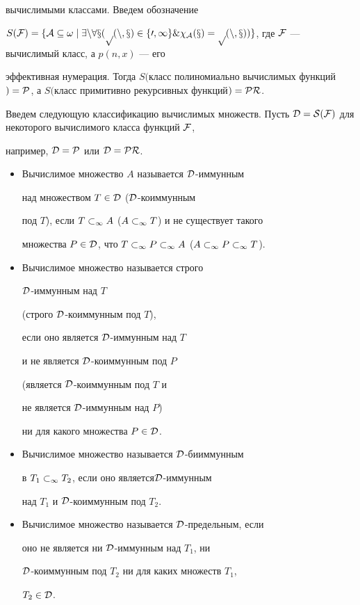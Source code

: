 вычислимыми классами. Введем обозначение


$S(\cal{F})=\{A\subseteq\omega\mid \exists n\forall x(p(n,x)\in\{0,1\}\&


\chi_A(x)=p(n,x))\}$, где $\cal{F}$ --- вычислимый класс, а $p(n,x)$ --- его


эффективная нумерация. Тогда $S($класс полиномиально вычислимых функций$)=


\cal{P}$, а $S($класс примитивно рекурсивных функций$)=\cal{PR}$.





\begin{defn}


Введем следующую классификацию вычислимых множеств. Пусть $\cal{D}=


S(\cal{F})$ для некоторого вычислимого класса функций $\cal{F}$,


например, $\cal{D}=\cal{P}$ или $\cal{D}=\cal{PR}$.


\begin{itemize}


\item[1)] Вычислимое множество $A$ называется $\cal{D}$-иммунным


над множеством $T\in\cal{D}$ ($\cal{D}$-ко\-им\-мун\-ным


под $T$), если ${T}\subset_\infty{A}$ (${A}\subset_\infty{T}$) и не существует такого


множества $P\in\cal{D}$, что ${T}\subset_\infty{{P}\subset_\infty{A}}$ (${A}\subset_\infty{{P}\subset_\infty{T}}$).


\item[2)] Вычислимое множество называется строго


$\cal{D}$-иммунным над $T$


(строго $\cal{D}$-коиммунным под $T$),


если оно является $\cal{D}$-иммунным над $T$


и не является $\cal{D}$-коиммунным под $P$


(является $\cal{D}$-коиммунным под $T$ и


не является $\cal{D}$-иммунным над $P$)


ни для какого множества $P\in\cal{D}$.


\item[3)] Вычислимое множество называется $\cal{D}$-бииммунным


в ${T_1}\subset_\infty{T_2}$, если оно является\linebreak $\cal{D}$-иммунным


над $T_1$ и $\cal{D}$-коиммунным под $T_2$.


\item[4)] Вычислимое множество называется $\cal{D}$-предельным, если


оно не является ни $\cal{D}$-иммунным над $T_1$, ни


$\cal{D}$-коиммунным под $T_2$ ни для каких множеств $T_1$,


$T_2\in\cal{D}$.


\end{itemize}


\end{defn}





